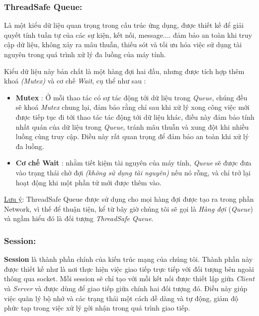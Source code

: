 \subsubsection{ThreadSafe Queue: }

Là một kiểu dữ liệu quan trọng trong cấu trúc ứng dụng, được thiết kế để giải quyết tính tuần tự của các sự kiện, kết nối, message....  đảm bảo an toàn khi truy cập dữ liệu, không xảy ra mâu thuẫn, thiếu sót và tối ưu hóa việc sử dụng tài nguyên trong quá trình xử lý đa luồng của máy tính.

Kiểu dữ liệu này bản chất là một hàng đợi hai đầu, nhưng được tích hợp thêm khoá \textit{(Mutex)} và cơ chế \textit{Wait}, cụ thể như sau :
\begin{itemize}
	\item \textbf{Mutex} : Ở mỗi thao tác có sự tác động tới dữ liệu trong \textit{Queue}, chúng đều sẽ khoá \textit{Mutex} chung lại, đảm bảo rằng chỉ sau khi xử lý xong công việc mới được tiếp tục đi tới thao tác tác động tới dữ liệu khác, điều này đảm bảo tính nhất quán của dữ liệu trong \textit{Queue}, tránh mâu thuẫn và xung đột khi nhiều luồng cùng truy cập. Điều này rất quan trọng để đảm bảo an toàn khi xử lý đa luồng.
	\item \textbf{Cơ chế Wait} : nhằm tiết kiệm tài nguyên của máy tính, \textit{Queue} sẽ được đưa vào trạng thái chờ đợi \textit{(không sử dụng tài nguyên)} nếu nó rỗng, và chỉ trở lại hoạt động khi một phần tử mới được thêm vào.
\end{itemize}

\underline{Lưu ý}: ThreadSafe Queue được sử dụng cho mọi hàng đợi được tạo ra trong phần Network, vì thế để thuận tiện, kể từ bây giờ chúng tôi sẽ gọi là \textit{Hàng đợi} (\textit{Queue}) và ngầm hiểu đó là đối tượng \textit{ThreadSafe Queue}.

\subsubsection{Session: }
\textbf{Session} là thành phần chính của kiến trúc mạng của chúng tôi. Thành phần này được thiết kế như là nơi thực hiện việc giao tiếp trực tiếp với đối tượng bên ngoài thông qua socket. Mỗi session sẽ chỉ tạo với mỗi kết nối được thiết lập giữa \textit{Client} và \textit{Server} và được dùng để giao tiếp giữa chính hai đối tượng đó. Điều này giúp việc quãn lý bộ nhớ và các trạng thái một cách dễ dàng và tự động, giảm độ phức tạp trong việc xử lý gởi nhận trong quá trình giao tiếp.

